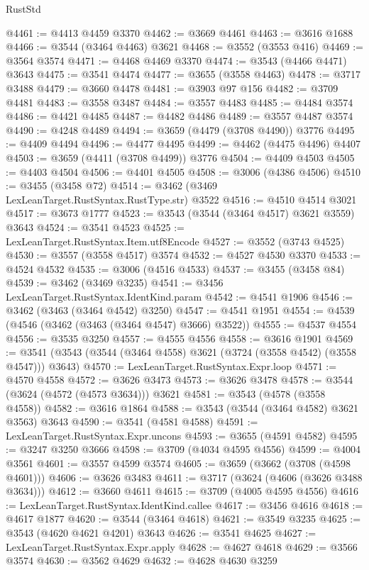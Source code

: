 \begin{lexlean}{RustStd}
\begin{coremodule}
@4461 := @4413 @4459 @3370
@4462 := @3669 @4461
@4463 := @3616 @1688
@4466 := @3544 (@3464 @4463) @3621
@4468 := @3552 (@3553 @416)
@4469 := @3564 @3574
@4471 := @4468 @4469 @3370
@4474 := @3543 (@4466 @4471) @3643
@4475 := @3541 @4474
@4477 := @3655 (@3558 @4463)
@4478 := @3717 @3488
@4479 := @3660 @4478
@4481 := @3903 @97 @156
@4482 := @3709 @4481
@4483 := @3558 @3487
@4484 := @3557 @4483
@4485 := @4484 @3574
@4486 := @4421 @4485
@4487 := @4482 @4486
@4489 := @3557 @4487 @3574
@4490 := @4248 @4489
@4494 := @3659 (@4479 (@3708 @4490)) @3776
@4495 := @4409 @4494
@4496 := @4477 @4495
@4499 := @4462 (@4475 @4496) @4407
@4503 := @3659 (@4411 (@3708 @4499)) @3776
@4504 := @4409 @4503
@4505 := @4403 @4504
@4506 := @4401 @4505
@4508 := @3006 (@4386 @4506)
@4510 := @3455 (@3458 @72)
@4514 := @3462 (@3469 LexLeanTarget.RustSyntax.RustType.str) @3522
@4516 := @4510 @4514 @3021
@4517 := @3673 @1777
@4523 := @3543 (@3544 (@3464 @4517) @3621 @3559) @3643
@4524 := @3541 @4523
@4525 := LexLeanTarget.RustSyntax.Item.utf8Encode
@4527 := @3552 (@3743 @4525)
@4530 := @3557 (@3558 @4517) @3574
@4532 := @4527 @4530 @3370
@4533 := @4524 @4532
@4535 := @3006 (@4516 @4533)
@4537 := @3455 (@3458 @84)
@4539 := @3462 (@3469 @3235)
@4541 := @3456 LexLeanTarget.RustSyntax.IdentKind.param
@4542 := @4541 @1906
@4546 := @3462 (@3463 (@3464 @4542) @3250)
@4547 := @4541 @1951
@4554 := @4539 (@4546 (@3462 (@3463 (@3464 @4547) @3666) @3522))
@4555 := @4537 @4554
@4556 := @3535 @3250
@4557 := @4555 @4556
@4558 := @3616 @1901
@4569 := @3541 (@3543 (@3544 (@3464 @4558) @3621 (@3724 (@3558 @4542) (@3558 @4547))) @3643)
@4570 := LexLeanTarget.RustSyntax.Expr.loop
@4571 := @4570 @4558
@4572 := @3626 @3473
@4573 := @3626 @3478
@4578 := @3544 (@3624 (@4572 (@4573 @3634))) @3621
@4581 := @3543 (@4578 (@3558 @4558))
@4582 := @3616 @1864
@4588 := @3543 (@3544 (@3464 @4582) @3621 @3563) @3643
@4590 := @3541 (@4581 @4588)
@4591 := LexLeanTarget.RustSyntax.Expr.uncons
@4593 := @3655 (@4591 @4582)
@4595 := @3247 @3250 @3666
@4598 := @3709 (@4034 @4595 @4556)
@4599 := @4004 @3561
@4601 := @3557 @4599 @3574
@4605 := @3659 (@3662 (@3708 (@4598 @4601)))
@4606 := @3626 @3483
@4611 := @3717 (@3624 (@4606 (@3626 @3488 @3634)))
@4612 := @3660 @4611
@4615 := @3709 (@4005 @4595 @4556)
@4616 := LexLeanTarget.RustSyntax.IdentKind.callee
@4617 := @3456 @4616
@4618 := @4617 @1877
@4620 := @3544 (@3464 @4618)
@4621 := @3549 @3235
@4625 := @3543 (@4620 @4621 @4201) @3643
@4626 := @3541 @4625
@4627 := LexLeanTarget.RustSyntax.Expr.apply
@4628 := @4627 @4618
@4629 := @3566 @3574
@4630 := @3562 @4629
@4632 := @4628 @4630 @3259

\end{coremodule}
\end{lexlean}

